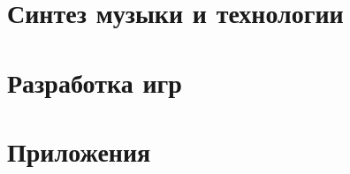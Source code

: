 \documentclass[a4paper,twoside]{book}
\begin{document}

\chapter{Синтез музыки и технологии}















\chapter{Разработка игр}






\printglossaries

\chapter*{Приложения}



\end{document}

